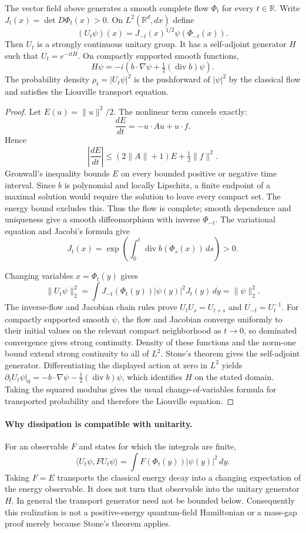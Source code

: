 \begin{theorem}
The vector field above generates a smooth complete flow $\Phi_t$ for every $t\in\mathbb R$. Write $J_t(x)=\det D\Phi_t(x)>0$. On $L^2(\mathbb R^d,dx)$ define
\[
 (U_t\psi)(x)=J_{-t}(x)^{1/2}\psi(\Phi_{-t}(x)).
\]
Then $U_t$ is a strongly continuous unitary group. It has a self-adjoint generator $H$ such that $U_t=e^{-itH}$. On compactly supported smooth functions,
\[
 H\psi=-i\left(b\cdot\nabla\psi+\tfrac12(\operatorname{div}b)\psi\right).
\]
The probability density $\rho_t=|U_t\psi|^2$ is the pushforward of $|\psi|^2$ by the classical flow and satisfies the Liouville transport equation.
\end{theorem}
\begin{proof}
Let $E(u)=\|u\|^2/2$. The nonlinear term cancels exactly:
\[
 \frac{dE}{dt}=-u\cdot Au+u\cdot f.
\]
Hence
\[
 \left|\frac{dE}{dt}\right|\le(2\|A\|+1)E+\tfrac12\|f\|^2.
\]
Gronwall's inequality bounds $E$ on every bounded positive or negative time interval. Since $b$ is polynomial and locally Lipschitz, a finite endpoint of a maximal solution would require the solution to leave every compact set. The energy bound excludes this. Thus the flow is complete; smooth dependence and uniqueness give a smooth diffeomorphism with inverse $\Phi_{-t}$. The variational equation and Jacobi's formula give
\[
 J_t(x)=\exp\!\left(\int_0^t\operatorname{div}b(\Phi_s(x))\,ds\right)>0.
\]

Changing variables $x=\Phi_t(y)$ gives
\[
 \|U_t\psi\|_2^2
 =\int J_{-t}(\Phi_t(y))|\psi(y)|^2J_t(y)\,dy
 =\|\psi\|_2^2.
\]
The inverse-flow and Jacobian chain rules prove $U_tU_s=U_{t+s}$ and $U_{-t}=U_t^{-1}$. For compactly supported smooth $\psi$, the flow and Jacobian converge uniformly to their initial values on the relevant compact neighborhood as $t\to0$, so dominated convergence gives strong continuity. Density of these functions and the norm-one bound extend strong continuity to all of $L^2$. Stone's theorem gives the self-adjoint generator. Differentiating the displayed action at zero in $L^2$ yields $\partial_tU_t\psi|_0=-b\cdot\nabla\psi-\frac12(\operatorname{div}b)\psi$, which identifies $H$ on the stated domain. Taking the squared modulus gives the usual change-of-variables formula for transported probability and therefore the Liouville equation.
\end{proof}

\paragraph{Why dissipation is compatible with unitarity.}
For an observable $F$ and states for which the integrals are finite,
\[
 \langle U_t\psi,FU_t\psi\rangle
 =\int F(\Phi_t(y))|\psi(y)|^2\,dy.
\]
Taking $F=E$ transports the classical energy decay into a changing expectation of the energy observable. It does not turn that observable into the unitary generator $H$. In general the transport generator need not be bounded below. Consequently this realization is not a positive-energy quantum-field Hamiltonian or a mass-gap proof merely because Stone's theorem applies.

